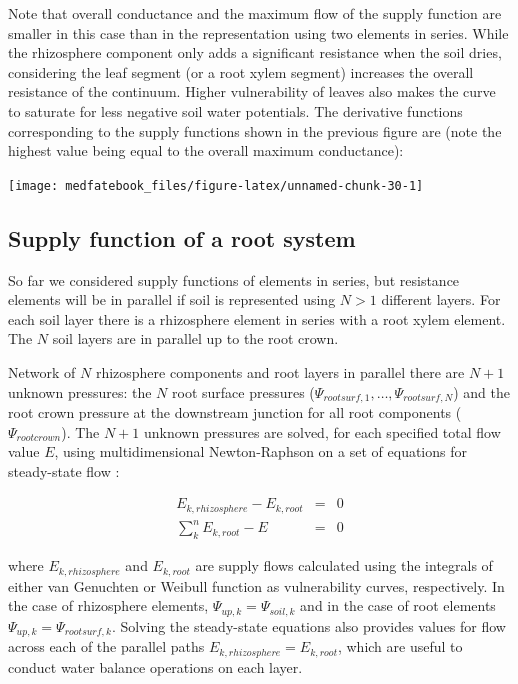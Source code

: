 \documentclass[]{book}
\begin{document}
Note that overall conductance and the maximum flow of the supply
function are smaller in this case than in the representation using two
elements in series. While the rhizosphere component only adds a
significant resistance when the soil dries, considering the leaf segment
(or a root xylem segment) increases the overall resistance of the
continuum. Higher vulnerability of leaves also makes the curve to
saturate for less negative soil water potentials. The derivative
functions corresponding to the supply functions shown in the previous
figure are (note the highest value being equal to the overall maximum
conductance):

\begin{center}\texttt{[image: medfatebook\_files/figure-latex/unnamed-chunk-30-1]} \end{center}

\subsection{Supply function of a root
system}\label{supply-function-of-a-root-system}

So far we considered supply functions of elements in series, but
resistance elements will be in parallel if soil is represented using
\(N>1\) different layers. For each soil layer there is a rhizosphere
element in series with a root xylem element. The \(N\) soil layers are
in parallel up to the root crown.

Network of \(N\) rhizosphere components and root layers in parallel
there are \(N+1\) unknown pressures: the \(N\) root surface pressures
(\(\Psi_{rootsurf,1},\dots,\Psi_{rootsurf,N}\)) and the root crown
pressure at the downstream junction for all root components
(\(\Psi_{rootcrown}\)). The \(N+1\) unknown pressures are solved, for
each specified total flow value \(E\), using multidimensional
Newton-Raphson on a set of equations for steady-state flow
\citep{Sperry2016a}:

\begin{eqnarray}
   E_{k, rhizosphere}-E_{k,root} &=& 0 \\
   \sum_{k}^{n}{E_{k,root}}-E &=& 0
\end{eqnarray}

where \(E_{k, rhizosphere}\) and \(E_{k, root}\) are supply flows
calculated using the integrals of either van Genuchten or Weibull
function as vulnerability curves, respectively. In the case of
rhizosphere elements, \(\Psi_{up,k}=\Psi_{soil,k}\) and in the case of
root elements \(\Psi_{up,k}=\Psi_{rootsurf,k}\). Solving the
steady-state equations also provides values for flow across each of the
parallel paths \(E_{k, rhizosphere} = E_{k, root}\), which are useful to
conduct water balance operations on each layer.
\end{document}
